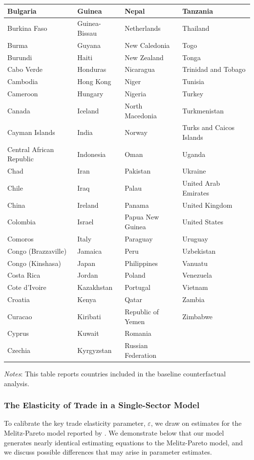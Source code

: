 \documentclass[12pt]{article}
\begin{document}
\begin{table}[htbp]
\begin{tabular}{|l|l|l|l|}
\hline
Bulgaria & Guinea & Nepal & Tanzania \\
\hline
Burkina Faso & Guinea-Bissau & Netherlands & Thailand \\
\hline
Burma & Guyana & New Caledonia & Togo \\
\hline
Burundi & Haiti & New Zealand & Tonga \\
\hline
Cabo Verde & Honduras & Nicaragua & Trinidad and Tobago \\
\hline
Cambodia & Hong Kong & Niger & Tunisia \\
\hline
Cameroon & Hungary & Nigeria & Turkey \\
\hline
Canada & Iceland & North Macedonia & Turkmenistan \\
\hline
Cayman Islands & India & Norway & Turks and Caicos Islands \\
\hline
Central African Republic & Indonesia & Oman & Uganda \\
\hline
Chad & Iran & Pakistan & Ukraine \\
\hline
Chile & Iraq & Palau & United Arab Emirates \\
\hline
China & Ireland & Panama & United Kingdom \\
\hline
Colombia & Israel & Papua New Guinea & United States \\
\hline
Comoros & Italy & Paraguay & Uruguay \\
\hline
Congo (Brazzaville) & Jamaica & Peru & Uzbekistan \\
\hline
Congo (Kinshasa) & Japan & Philippines & Vanuatu \\
\hline
Costa Rica & Jordan & Poland & Venezuela \\
\hline
Cote d'Ivoire & Kazakhstan & Portugal & Vietnam \\
\hline
Croatia & Kenya & Qatar & Zambia \\
\hline
Curacao & Kiribati & Republic of Yemen & Zimbabwe \\
\hline
Cyprus & Kuwait & Romania &  \\
\hline
Czechia & Kyrgyzstan & Russian Federation &  \\
\hline
\end{tabular}
\vspace{-10pt}
\begin{flushleft}
\footnotesize{\textit{Notes}: This table reports countries included in the baseline counterfactual analysis.}
\end{flushleft}
\end{table}

\subsubsection{The Elasticity of Trade in a Single-Sector Model}\label{sec:epsilon}
To calibrate the key trade elasticity parameter, $\varepsilon$, we draw on estimates for the Melitz-Pareto model reported by \citet{NBERw20495}. We demonstrate below that our model generates nearly identical estimating equations to the Melitz-Pareto model, and we discuss possible differences that may arise in parameter estimates.
\end{document}
